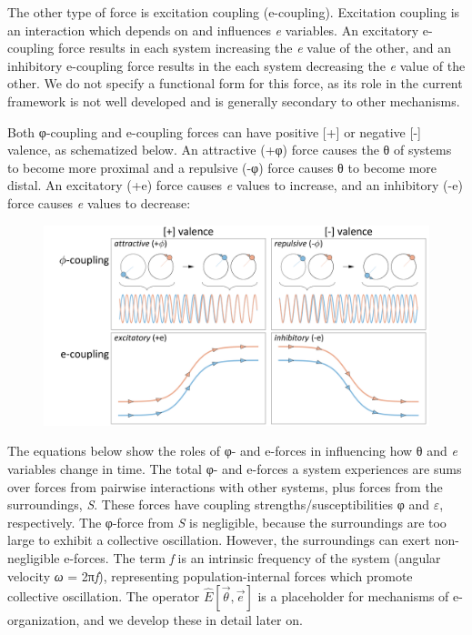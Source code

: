   The other type of force is excitation coupling (e-coupling). Excitation coupling is an interaction which depends on and influences \textit{e} variables. An excitatory e-coupling force results in each system increasing the \textit{e} value of the other, and an inhibitory e-coupling force results in the each system decreasing the \textit{e} value of the other. We do not specify a functional form for this force, as its role in the current framework is not well developed and is generally secondary to other mechanisms.

  Both φ-coupling and e-coupling forces can have positive [+] or negative [-] valence, as schematized below. An attractive (+φ) force causes the θ of systems to become more proximal and a repulsive (-φ) force causes θ to become more distal. An excitatory (+e) force causes \textit{e} values to increase, and an inhibitory (-e) force causes \textit{e} values to decrease: 

  
\begin{figure}
\includegraphics[width=\textwidth]{figures/Tilsen-img20.png}
\caption{\missingcaption}
\label{fig:2:13}
\end{figure}
 

  The equations below show the roles of φ- and e-forces in influencing how θ and \textit{e} variables change in time. The total φ- and e-forces a system experiences are sums over forces from pairwise interactions with other systems, plus forces from the surroundings, \textit{S}. These forces have coupling strengths/susceptibilities φ and $\varepsilon $, respectively. The φ-force from \textit{S} is negligible, because the surroundings are too large to exhibit a collective oscillation. However, the surroundings can exert non-negligible e-forces. The term \textit{f} is an intrinsic frequency of the system (angular velocity \textit{ω} = 2π\textit{f}), representing population-internal forces which promote collective oscillation. The operator  $\widehat {{E}}\left[\overrightarrow{{\theta}} ,\overrightarrow{{e}}\right]$ is a placeholder for mechanisms of e-organization, and we develop these in detail later on.

